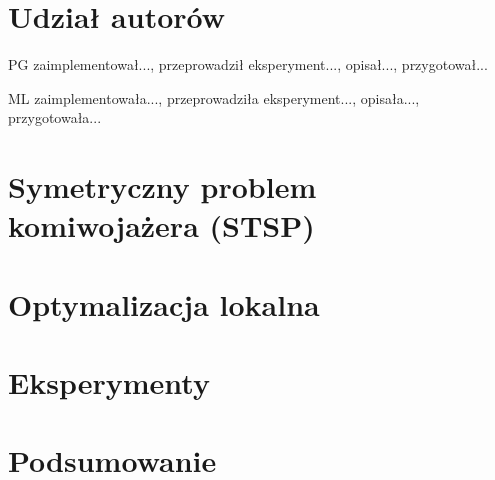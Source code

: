 \documentclass{article}
\begin{document}


\section*{Udział autorów}
\begin{tightlist}
\item PG zaimplementował..., przeprowadził eksperyment..., opisał..., przygotował...
\item ML zaimplementowała..., przeprowadziła eksperyment..., opisała..., przygotowała...
\end{tightlist}

\clearpage

\section{Symetryczny problem komiwojażera (STSP)}


\clearpage

\section{Optymalizacja lokalna}


\clearpage

\section{Eksperymenty}


\clearpage

\section{Podsumowanie}

\end{document}
